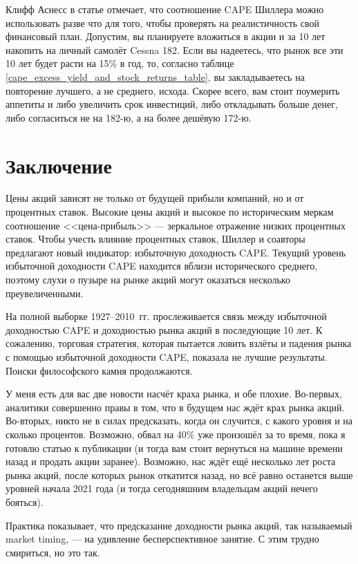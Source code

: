 Клифф Аснесс в статье \cite{asness2012old} отмечает, что соотношение CAPE 
Шиллера можно использовать разве что для того, чтобы проверять на 
реалистичность свой финансовый план. Допустим, вы планируете вложиться в акции 
и за 10 лет накопить на личный самолёт Cessna 182. Если вы надеетесь, что 
рынок все эти 10 лет будет расти на 15\% в год, то, согласно таблице 
\ref{cape_excess_yield_and_stock_returns_table}, вы закладываетесь на 
повторение лучшего, а не среднего, исхода. Скорее всего, вам стоит поумерить 
аппетиты и либо увеличить срок инвестиций, либо откладывать больше денег, либо 
согласиться не на 182-ю, а на более дешёвую 172-ю.

\section*{Заключение}

Цены акций зависят не только от будущей прибыли компаний, но и от процентных 
ставок. Высокие цены акций и высокое по историческим меркам соотношение 
<<цена-прибыль>> --- зеркальное отражение низких процентных ставок. Чтобы 
учесть влияние процентных ставок, Шиллер и соавторы предлагают новый 
индикатор: избыточную доходность CAPE. Текущий уровень избыточной доходности 
CAPE находится вблизи исторического среднего, поэтому слухи о пузыре на рынке 
акций могут оказаться несколько преувеличенными.

На полной выборке 1927--2010\, гг. прослеживается связь между избыточной 
доходностью CAPE и доходностью рынка акций в последующие 10 лет. К сожалению, 
торговая стратегия, которая пытается ловить взлёты и падения рынка с помощью 
избыточной доходности CAPE, показала не лучшие результаты. Поиски философского 
камня продолжаются.

У меня есть для вас две новости насчёт краха рынка, и обе плохие. Во-первых, 
аналитики совершенно правы в том, что в будущем нас ждёт крах рынка акций.
Во-вторых, никто не в силах предсказать, когда он случится, с какого уровня и на 
сколько процентов. Возможно, обвал на 40\% уже произошёл за то время, пока я 
готовлю статью к публикации (и тогда вам стоит вернуться на машине времени 
назад и продать акции заранее). Возможно, нас ждёт ещё несколько лет роста 
рынка акций, после которых рынок откатится назад, но всё равно останется выше 
уровней начала 2021 года (и тогда сегодняшним владельцам акций нечего 
бояться).

Практика показывает, что предсказание доходности рынка акций, так называемый 
market timing, --- на удивление бесперспективное занятие. С этим трудно 
смириться, но это так.

